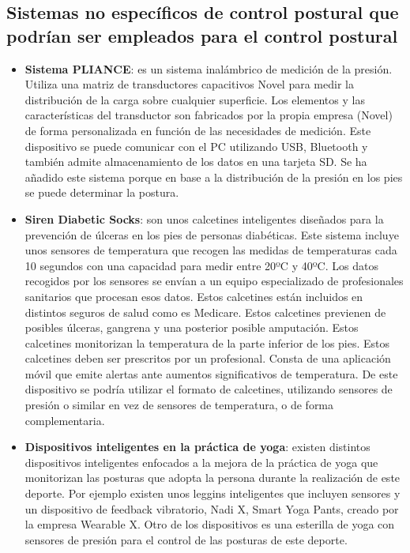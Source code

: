 \subsection{Sistemas no específicos de control postural que podrían ser empleados para el control postural} 
\begin{itemize}
    \item \textbf{Sistema PLIANCE}\cite{Pliance1,Pliance2}: es un sistema inalámbrico de medición de la presión. Utiliza una matriz de transductores capacitivos Novel para medir la distribución de la carga sobre cualquier superficie. Los elementos y las características del transductor son fabricados por la propia empresa (Novel) de forma personalizada en función de las necesidades de medición. Este dispositivo se puede comunicar con el PC utilizando USB, Bluetooth y también admite almacenamiento de los datos en una tarjeta SD. Se ha añadido este sistema porque en base a la distribución de la presión en los pies se puede determinar la postura. 
    
    \item \textbf{Siren Diabetic Socks}\cite{SirenSocks1,SirenSocks2}: son unos calcetines inteligentes diseñados para la prevención de úlceras en los pies de personas diabéticas. Este sistema incluye unos sensores de temperatura que recogen las medidas de temperaturas cada 10 segundos con una capacidad para medir entre 20ºC y 40ºC. Los datos recogidos por los sensores se envían a un equipo especializado de profesionales sanitarios que procesan esos datos. Estos calcetines están incluidos en distintos seguros de salud como es Medicare. Estos calcetines previenen de posibles úlceras, gangrena y una posterior posible amputación. Estos calcetines monitorizan la temperatura de la parte inferior de los pies. Estos calcetines deben ser prescritos por un profesional. Consta de una aplicación móvil que emite alertas ante aumentos significativos de temperatura. De este dispositivo se podría utilizar el formato de calcetines, utilizando sensores de presión o similar en vez de sensores de temperatura, o de forma complementaria.


    \item \textbf{Dispositivos inteligentes en la práctica de yoga}\cite{YOGA}: existen distintos dispositivos inteligentes enfocados a la mejora de la práctica de yoga que monitorizan las posturas que adopta la persona durante la realización de este deporte. Por ejemplo existen unos leggins inteligentes que incluyen sensores y un dispositivo de feedback vibratorio, Nadi X, Smart Yoga Pants\cite{NadiX}, creado por la empresa Wearable X. Otro de los dispositivos es una esterilla de yoga con sensores de presión para el control de las posturas de este deporte. 

    
\end{itemize}

